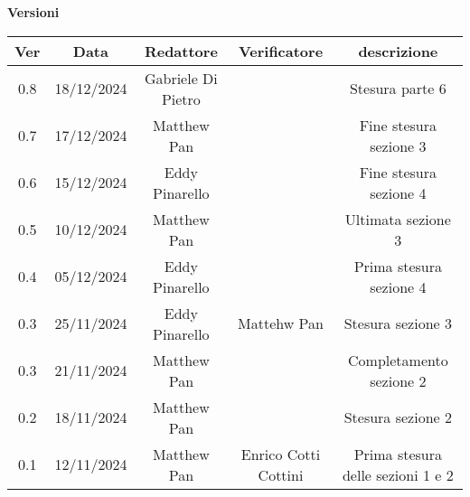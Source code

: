 \documentclass{article}
\begin{document}
\newpage
\begin{center}
    \textbf{Versioni}
    \\
    \vspace{0.3cm}
    \begin{tabular}{|c|c|c|c|c|}
        \hline
        \textbf{Ver} & \textbf{Data} & \textbf{Redattore} & \textbf{Verificatore} & \textbf{descrizione}\\
        \hline
        0.8 & 18/12/2024 & Gabriele Di Pietro &               & Stesura parte 6 \\ 
        0.7 & 17/12/2024 & Matthew Pan &                      & Fine stesura sezione 3\\
        0.6 & 15/12/2024 & Eddy Pinarello &                   & Fine stesura sezione 4\\
        0.5 & 10/12/2024 & Matthew Pan &                      & Ultimata sezione 3\\
        0.4 & 05/12/2024 & Eddy Pinarello &                   & Prima stesura sezione 4\\
        0.3 & 25/11/2024 & Eddy Pinarello  & Mattehw Pan       & Stesura sezione 3\\
        0.3 & 21/11/2024 & Matthew Pan &                      & Completamento sezione 2\\
        0.2 & 18/11/2024 & Matthew Pan &                      & Stesura sezione 2\\
        0.1 & 12/11/2024 & Matthew Pan & Enrico Cotti Cottini & Prima stesura delle sezioni 1 e 2\\
        \hline
    \end{tabular}
\end{center}


\newpage
\tableofcontents
\listoftables
\listoffigures

 
\newpage


\newpage


\newpage


\newpage





\end{document}
